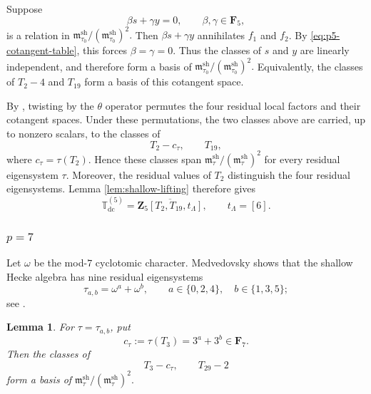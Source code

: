 \documentclass[11pt]{article}
\theoremstyle{plain}
\newtheorem{lemma}[theorem]{Lemma}
\theoremstyle{definition}
\theoremstyle{remark}
\numberwithin{equation}{section}
\begin{document}
Suppose \[\beta s+\gamma y=0,\qquad\beta,\gamma\in\mathbf F_5,\] is a relation in \(\mathfrak m_{\tau_0}^{\mathrm{sh}}/(\mathfrak m_{\tau_0}^{\mathrm{sh}})^2.\) Then \(\beta s+\gamma y\) annihilates \(f_1\) and \(f_2\). By \eqref{eq:p5-cotangent-table}, this forces \(\beta=\gamma=0.\) Thus the classes of \(s\) and \(y\) are linearly independent, and therefore form a basis of \(\mathfrak m_{\tau_0}^{\mathrm{sh}}/(\mathfrak m_{\tau_0}^{\mathrm{sh}})^2.\) Equivalently, the classes of \(T_2-4\) and \(T_{19}\) form a basis of this cotangent space.

By \cite[Proposition~2.41]{Medvedovsky2015}, twisting by the \(\theta\) operator permutes the four residual local factors and their cotangent spaces. Under these permutations, the two classes above are carried, up to nonzero scalars, to the classes of
\[
T_2-c_\tau,\qquad T_{19},
\]
where \(c_\tau=\tau(T_2)\). Hence these classes span \(\mathfrak m_\tau^{\mathrm{sh}}/(\mathfrak m_\tau^{\mathrm{sh}})^2\) for every residual eigensystem \(\tau\). Moreover, the residual values of \(T_2\) distinguish the four residual eigensystems. Lemma \ref{lem:shallow-lifting} therefore gives \begin{equation}\mathbb T_{\mathrm{dc}}^{(5)}=\overline{\mathbf Z_5[T_2,T_{19},t_\Lambda]},\qquad t_\Lambda=[6].\label{eq:p5-big-generation}\end{equation}

\subsubsection{\texorpdfstring{$p=7$}{p=7}}
\label{sec:big-hecke-p7}
Let \(\omega\) be the mod-\(7\) cyclotomic character. Medvedovsky shows that the shallow Hecke algebra has nine residual eigensystems \[\tau_{a,b}=\omega^a+\omega^b,\qquad a\in\{0,2,4\},\quad b\in\{1,3,5\};\] see \cite[Theorem~8.1 and \S8.7]{Medvedovsky2015}.

\begin{lemma}
\label{lem:p7-shallow-parameters}
For \(\tau=\tau_{a,b}\), put \[c_\tau:=\tau(T_3)=3^a+3^b\in\mathbf F_7.\] Then the classes of \[T_3-c_\tau,\qquad T_{29}-2\] form a basis of \(\mathfrak m_\tau^{\mathrm{sh}}/(\mathfrak m_\tau^{\mathrm{sh}})^2.\)
\end{lemma}
\end{document}
